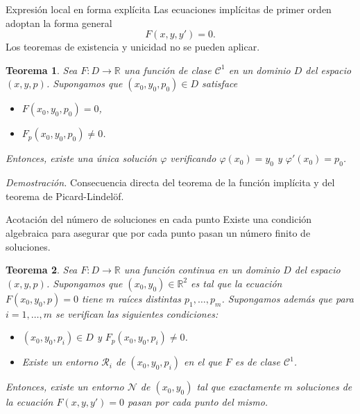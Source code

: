\documentclass[10pt, spanish]{beamer}
\newtheorem{teorema}{Teorema}
\begin{document}
\begin{frame}{Expresión local en forma explícita}
  Las ecuaciones implícitas de primer orden adoptan la forma general
  \[
  F(x,y,y')=0.
  \]
  Los teoremas de existencia y unicidad no se pueden aplicar.
  \begin{teorema}
    Sea $F:D \to \mathbb{R}$ una función de clase $\mathcal C^1$ en un dominio $D$ del espacio $(x,y,p)$. Supongamos que $(x_0,y_0,p_0)\in D$ satisface
    \begin{itemize}
      \item $F(x_0,y_0,p_0)=0$,
      \item $F_p(x_0,y_0,p_0)\neq 0$.
    \end{itemize}
    Entonces, existe una única solución $\varphi$ verificando $\varphi(x_0)=y_0$ y $\varphi'(x_0)=p_0$.
  \end{teorema}

  \textit{Demostración.} Consecuencia directa del teorema de la función implícita y del teorema de Picard-Lindelöf.
\end{frame}

\begin{frame}{Acotación del número de soluciones en cada punto}
  Existe una condición algebraica para asegurar que por cada punto pasan un número finito de soluciones.

  \begin{teorema}
    Sea $F:D\to \mathbb{R}$ una función continua en un dominio $D$ del espacio $(x,y,p)$. Supongamos que $(x_0,y_0)\in \mathbb{R}^2$ es tal que la ecuación $F(x_0, y_0,p)=0$ tiene $m$ raíces distintas $p_1,\dots,p_m$. Supongamos además que para $i=1,\dots, m$ se verifican las siguientes condiciones:
    \vspace{-1.5em}
    \begin{itemize}
      \item $(x_0,y_0,p_i)\in D$ y $F_p(x_0,y_0,p_i)\neq 0$.
      \item Existe un entorno $\mathcal R_i$ de $(x_0,y_0,p_i)$ en el que $F$ es de clase $\mathcal C^1$.
    \end{itemize}
    Entonces, existe un entorno $\mathcal N$ de $(x_0,y_0)$ tal que exactamente $m$ soluciones de la ecuación $F(x,y,y')=0$ pasan por cada punto del mismo.
  \end{teorema}
\end{frame}
\end{document}
